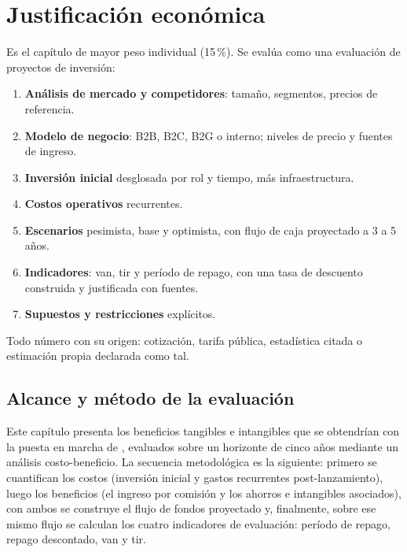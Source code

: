 
\chapter{Justificación económica}\label{cap:economica}

\begin{guia}
Es el capítulo de mayor peso individual (15\,\%). Se evalúa como una
evaluación de proyectos de inversión:
\begin{enumerate}
    \item \textbf{Análisis de mercado y competidores}: tamaño, segmentos,
          precios de referencia.
    \item \textbf{Modelo de negocio}: B2B, B2C, B2G o interno; niveles de
          precio y fuentes de ingreso.
    \item \textbf{Inversión inicial} desglosada por rol y tiempo, más
          infraestructura.
    \item \textbf{Costos operativos} recurrentes.
    \item \textbf{Escenarios} pesimista, base y optimista, con flujo de caja
          proyectado a 3 a 5 años.
    \item \textbf{Indicadores}: \gls{van}, \gls{tir} y período de repago,
          con una tasa de descuento construida y justificada con fuentes.
    \item \textbf{Supuestos y restricciones} explícitos.
\end{enumerate}
Todo número con su origen: cotización, tarifa pública, estadística
citada o estimación propia declarada como tal.
\end{guia}

\section{Alcance y método de la evaluación}

Este capítulo presenta los beneficios tangibles e intangibles que se
obtendrían con la puesta en marcha de \sistema{}, evaluados sobre un
horizonte de cinco años mediante un análisis costo-beneficio. La
secuencia metodológica es la siguiente: primero se cuantifican los
costos (inversión inicial y gastos recurrentes post-lanzamiento), luego
los beneficios (el ingreso por comisión y los ahorros e intangibles
asociados), con ambos se construye el flujo de fondos proyectado y,
finalmente, sobre ese mismo flujo se calculan los cuatro indicadores de
evaluación: período de repago, repago descontado, \gls{van} y \gls{tir}.

